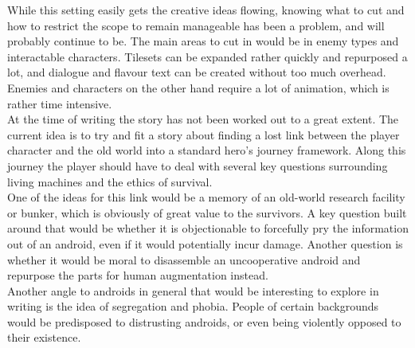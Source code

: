While this setting easily gets the creative ideas flowing, knowing what to cut and how to restrict the scope to remain manageable has been a problem, and will probably continue to be. The main areas to cut in would be in enemy types and interactable characters. Tilesets can be expanded rather quickly and repurposed a lot, and dialogue and flavour text can be created without too much overhead. Enemies and characters on the other hand require a lot of animation, which is rather time intensive. \\

At the time of writing the story has not been worked out to a great extent. The current idea is to try and fit a story about finding a lost link between the player character and the old world into a standard hero's journey framework. Along this journey the player should have to deal with several key questions surrounding living machines and the ethics of survival. \\

One of the ideas for this link would be a memory of an old-world research facility or bunker, which is obviously of great value to the survivors. A key question built around that would be whether it is objectionable to forcefully pry the information out of an android, even if it would potentially incur damage. Another question is whether it would be moral to disassemble an uncooperative android and repurpose the parts for human augmentation instead. \\

Another angle to androids in general that would be interesting to explore in writing is the idea of segregation and phobia. People of certain backgrounds would be predisposed to distrusting androids, or even being violently opposed to their existence.  \\

